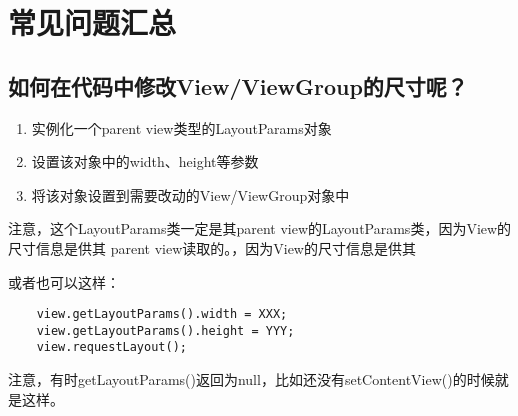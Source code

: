 ﻿\documentclass[a4paper]{article}
\begin{document}
  \section[常见问题汇总]{常见问题汇总}
  \subsection[动态修改尺寸]{如何在代码中修改View/ViewGroup的尺寸呢？}
  \begin{enumerate}
    \item 实例化一个parent view类型的LayoutParams对象
    \item 设置该对象中的width、height等参数
    \item 将该对象设置到需要改动的View/ViewGroup对象中
  \end{enumerate}
  注意，这个LayoutParams类一定是其parent view的LayoutParams类，因为View的尺寸信息是供其
  parent view读取的。，因为View的尺寸信息是供其


  或者也可以这样：
  \begin{verbatim}
    view.getLayoutParams().width = XXX;
    view.getLayoutParams().height = YYY;
    view.requestLayout();
  \end{verbatim}
  注意，有时getLayoutParams()返回为null，比如还没有setContentView()的时候就是这样。
\end{document}
